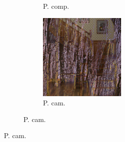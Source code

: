 \begin{figure}[]
\begin{subfigure}{\textwidth}
\begin{subfigure}{0.19\textwidth}
            \caption{P. comp.}
            \label{fig:ex03-staircase_illum-wood-pixel_im}
        \end{subfigure}
        \hfill
        \begin{subfigure}{0.19\textwidth}
            \centering
            \includegraphics[width=\textwidth]{images/04-experiment03/staircase_illum/wood/pixel_proj.jpg}
            \caption{P. cam.}
            \label{fig:ex03-staircase_illum-wood-pixel_proj}
        \end{subfigure}
        

\end{subfigure}
\end{figure}
